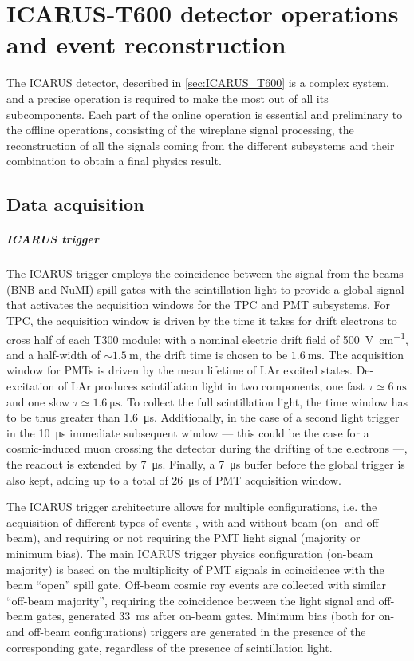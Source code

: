 
\chapter{ICARUS-T600 detector operations and event reconstruction}
\label{chap:event_reconstruction}

The ICARUS detector, described in \autoref{sec:ICARUS_T600} is a complex system, and a precise operation is required to make the most out of all its subcomponents. Each part of the online operation is essential and preliminary to the offline operations, consisting of the wireplane signal processing, the reconstruction of all the signals coming from the different subsystems and their combination to obtain a final physics result. 

\section{Data acquisition} \label{sec:DAQ}


\paragraph{ICARUS trigger} The ICARUS trigger employs the coincidence between the signal from the beams (BNB and NuMI) spill gates with the scintillation light to provide a global signal that activates  the acquisition windows for the TPC and PMT subsystems. For TPC, the acquisition window is driven by the time it takes for drift electrons to cross half of each T300 module: with a nominal electric drift field of \SI{500}{\volt\per\cm}, and a half-width of $\sim\SI{1.5}{\m}$, the drift time is chosen to be $\SI{1.6}{\ms}$. The acquisition window for PMTs is driven by the mean lifetime of LAr excited states. De-excitation of LAr produces scintillation light in two components, one fast $\tau\simeq \SI{6}{\ns}$ and one slow $\tau\simeq\SI{1.6}{\us}$. To collect the full scintillation light, the time window has to be thus greater than \SI{1.6}{\us}. Additionally, in the case of a second light trigger in the \SI{10}{\us} immediate subsequent window --- this could be the case for a cosmic-induced muon crossing the detector during the drifting of the electrons ---, the readout is extended by \SI{7}{\us}. Finally, a \SI{7}{\us} buffer before the global trigger is also kept, adding up to a total of \SI{26}{\us} of PMT acquisition window.  

The ICARUS trigger architecture allows for multiple configurations, i.e. the acquisition of different types of events \cite{ICARUS:2025kai}, with and without beam (on- and off-beam), and requiring or not requiring the PMT light signal (majority or minimum bias). The main ICARUS trigger physics configuration (on-beam majority) is based on the multiplicity of PMT signals in coincidence with the beam ``open'' spill gate. Off-beam cosmic ray events are collected with similar ``off-beam majority'', requiring the coincidence between the light signal and off-beam gates, generated \SI{33}{\ms} after on-beam gates. Minimum bias (both for on- and off-beam configurations) triggers are generated in the presence of the corresponding gate, regardless of the presence of scintillation light.


